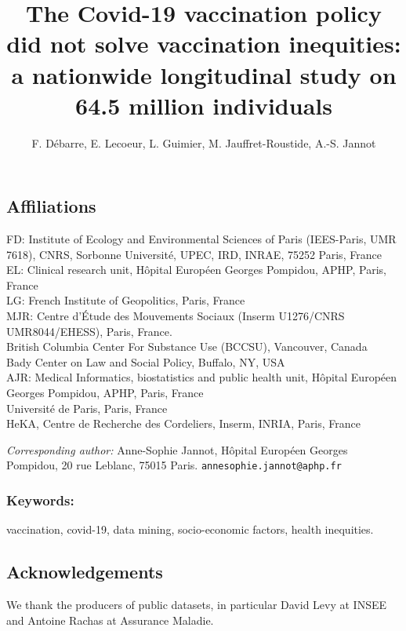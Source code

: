 \documentclass[
]{article}
\title{The Covid-19 vaccination policy did not solve vaccination
inequities: a nationwide longitudinal study on 64.5 million individuals}
\author{F. Débarre, E. Lecoeur, L. Guimier, M. Jauffret-Roustide, A.-S.
Jannot}
\date{}
\begin{document}
\maketitle

\hypertarget{affiliations}{%
\subsection{Affiliations}\label{affiliations}}

FD: Institute of Ecology and Environmental Sciences of Paris
(IEES-Paris, UMR 7618), CNRS, Sorbonne Université, UPEC, IRD, INRAE,
75252 Paris, France\\
EL: Clinical research unit, Hôpital Européen Georges Pompidou, APHP,
Paris, France\\
LG: French Institute of Geopolitics, Paris, France\\
MJR: Centre d'Étude des Mouvements Sociaux (Inserm U1276/CNRS
UMR8044/EHESS), Paris, France.\\
British Columbia Center For Substance Use (BCCSU), Vancouver, Canada\\
Bady Center on Law and Social Policy, Buffalo, NY, USA\\
AJR: Medical Informatics, biostatistics and public health unit, Hôpital
Européen Georges Pompidou, APHP, Paris, France\\
Université de Paris, Paris, France\\
HeKA, Centre de Recherche des Cordeliers, Inserm, INRIA, Paris, France

\emph{Corresponding author:} Anne-Sophie Jannot, Hôpital Européen
Georges Pompidou, 20 rue Leblanc, 75015 Paris.
\texttt{annesophie.jannot@aphp.fr}

\hypertarget{keywords}{%
\subsubsection{Keywords:}\label{keywords}}

vaccination, covid-19, data mining, socio-economic factors, health
inequities.

\hypertarget{acknowledgements}{%
\subsection{Acknowledgements}\label{acknowledgements}}

We thank the producers of public datasets, in particular David Levy at
INSEE and Antoine Rachas at Assurance Maladie.
\end{document}
